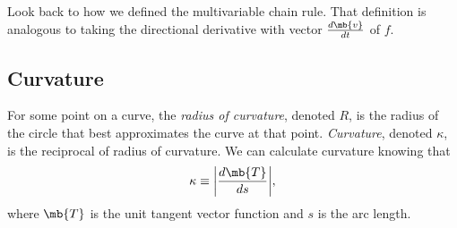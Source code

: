 \documentclass[11pt]{article}
\theoremstyle{definition}
\begin{document}
Look back to how we defined the multivariable chain rule. That definition is analogous to taking the directional derivative with vector $\frac{ d \mb{v}}{ d t}$ of $f$.




\subsection{Curvature}
 For some point on a curve, the  \textit{radius of curvature}, denoted $R$, is the radius of the circle that best approximates the curve at that point. \textit{Curvature}, denoted $\kappa$, is the reciprocal of radius of curvature. We can calculate curvature knowing that 
$$
\kappa \equiv \bigg|\frac{ d \mb{T}}{ d {s}}\bigg|,
$$
where $\mb{T}$ is the unit tangent vector function and $s$ is the arc length.
\end{document}

